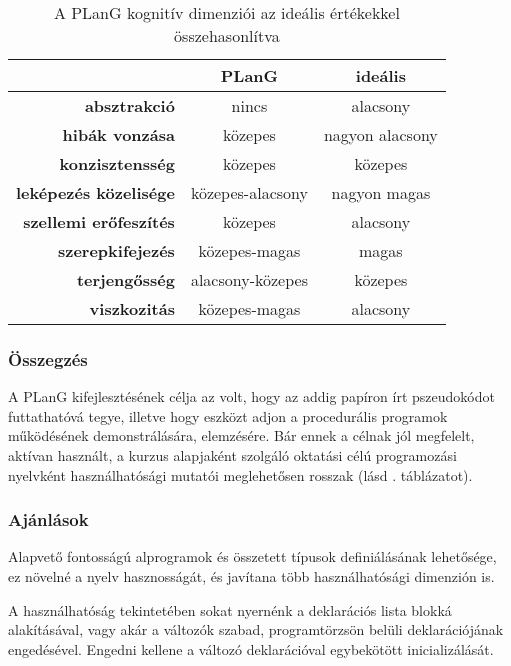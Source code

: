 \begin{table}[tb]
	\centering
	\begin{tabular}{ r c c }
						& \bfseries PLanG	 & \bfseries ideális  \\ \hline
		\bfseries absztrakció 		&\cellcolor{red!30}nincs & alacsony \\
		\bfseries hibák vonzása 	&\cellcolor{red!30}közepes & nagyon alacsony \\
		\bfseries konzisztensség 	&\cellcolor{green!30}közepes & közepes  \\
		\bfseries leképezés közelisége &\cellcolor{red!30}közepes-alacsony & nagyon magas \\
		\bfseries szellemi erőfeszítés &\cellcolor{red!30}közepes & alacsony \\
		\bfseries szerepkifejezés &\cellcolor{yellow!30}közepes-magas	& magas \\
		\bfseries terjengősség &\cellcolor{yellow!30}alacsony-közepes	& közepes \\
		\bfseries viszkozitás &\cellcolor{red!30}közepes-magas	& alacsony
	\end{tabular}
	\caption{A PLanG kognitív dimenziói az ideális értékekkel összehasonlítva}
	\label{tab:plangminmut}
\end{table}


\subsubsection{Összegzés}
A PLanG kifejlesztésének célja az volt, hogy az addig papíron írt pszeudokódot futtathatóvá tegye, illetve hogy eszközt adjon a procedurális programok működésének demonstrálására, elemzésére\cite{lovei}.
Bár ennek a célnak jól megfelelt, aktívan használt, a kurzus alapjaként szolgáló oktatási célú programozási nyelvként használhatósági mutatói meglehetősen rosszak (lásd . táblázatot).


\subsubsection{Ajánlások}
Alapvető fontosságú alprogramok és összetett típusok definiálásának lehetősége, ez növelné a nyelv hasznosságát, és javítana több használhatósági dimenzión is.

A használhatóság tekintetében sokat nyernénk a deklarációs lista blokká alakításával, vagy akár a változók szabad, programtörzsön belüli deklarációjának engedésével. Engedni kellene a változó deklarációval egybekötött inicializálását.

